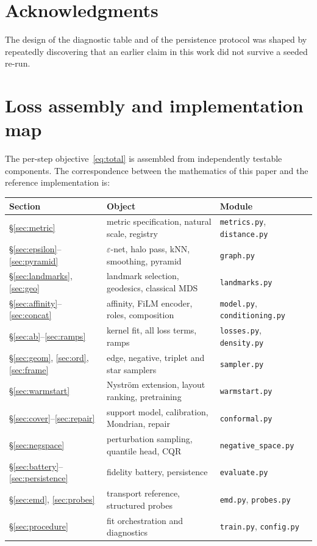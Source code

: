 \documentclass[12pt]{iopart}
\theoremstyle{definition}
\theoremstyle{plain}
\theoremstyle{remark}
\newcommand{\code}[1]{\texttt{#1}}
\begin{document}
\section*{Acknowledgments}

The design of the diagnostic table and of the persistence protocol was shaped
by repeatedly discovering that an earlier claim in this work did not survive a
seeded re-run.

\appendix

\section{Loss assembly and implementation map}
\label{app:impl}

The per-step objective~\eqref{eq:total} is assembled from independently testable
components. The correspondence between the mathematics of this paper and the
reference implementation is:

\begin{center}
\small
\begin{tabular}{lll}
\toprule
Section & Object & Module \\
\midrule
\S\ref{sec:metric} & metric specification, natural scale, registry
  & \code{metrics.py}, \code{distance.py} \\
\S\ref{sec:epsilon}--\ref{sec:pyramid} & $\varepsilon$-net, halo pass, kNN,
  smoothing, pyramid & \code{graph.py} \\
\S\ref{sec:landmarks}, \ref{sec:geo} & landmark selection, geodesics,
  classical MDS & \code{landmarks.py} \\
\S\ref{sec:affinity}--\ref{sec:concat} & affinity, FiLM encoder, roles,
  composition & \code{model.py}, \code{conditioning.py} \\
\S\ref{sec:ab}--\ref{sec:ramps} & kernel fit, all loss terms, ramps
  & \code{losses.py}, \code{density.py} \\
\S\ref{sec:geom}, \ref{sec:ord}, \ref{sec:frame} & edge, negative, triplet and
  star samplers & \code{sampler.py} \\
\S\ref{sec:warmstart} & Nystr\"om extension, layout ranking, pretraining
  & \code{warmstart.py} \\
\S\ref{sec:cover}--\ref{sec:repair} & support model, calibration, Mondrian,
  repair & \code{conformal.py} \\
\S\ref{sec:negspace} & perturbation sampling, quantile head, CQR
  & \code{negative\_space.py} \\
\S\ref{sec:battery}--\ref{sec:persistence} & fidelity battery, persistence
  & \code{evaluate.py} \\
\S\ref{sec:emd}, \ref{sec:probes} & transport reference, structured probes
  & \code{emd.py}, \code{probes.py} \\
\S\ref{sec:procedure} & fit orchestration and diagnostics
  & \code{train.py}, \code{config.py} \\
\bottomrule
\end{tabular}
\end{center}
\end{document}
